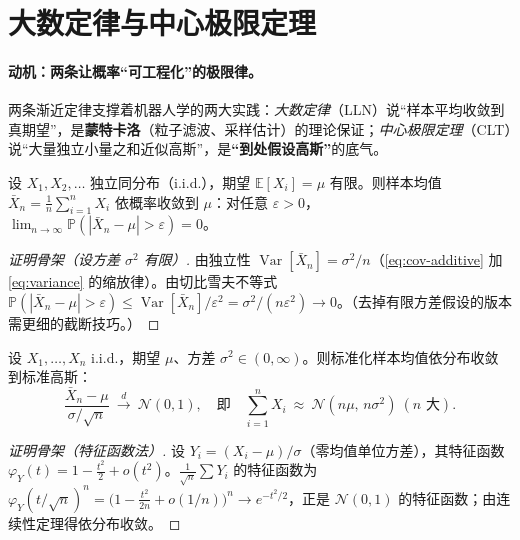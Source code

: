 \section{大数定律与中心极限定理}
\label{sec:prob-limit}

\paragraph{动机：两条让概率“可工程化”的极限律。}
两条渐近定律支撑着机器人学的两大实践：\emph{大数定律}（LLN）说“样本平均收敛到真期望”，是\textbf{蒙特卡洛}（粒子滤波、采样估计）的理论保证；\emph{中心极限定理}（CLT）说“大量独立小量之和近似高斯”，是\textbf{“到处假设高斯”}的底气。

\begin{theorem}[（弱）大数定律]\label{thm:lln}
设 $X_1,X_2,\dots$ 独立同分布（i.i.d.），期望 $\mathbb{E}[X_i]=\mu$ 有限。则样本均值 $\bar X_n=\frac1n\sum_{i=1}^n X_i$ 依概率收敛到 $\mu$：对任意 $\varepsilon>0$，$\lim_{n\to\infty}\mathbb{P}(|\bar X_n-\mu|>\varepsilon)=0$。
\end{theorem}
\begin{proof}[证明骨架（设方差 $\sigma^2$ 有限）]
由独立性 $\operatorname{Var}[\bar X_n]=\sigma^2/n$（\cref{eq:cov-additive} 加 \cref{eq:variance} 的缩放律）。由切比雪夫不等式 $\mathbb{P}(|\bar X_n-\mu|>\varepsilon)\le\operatorname{Var}[\bar X_n]/\varepsilon^2=\sigma^2/(n\varepsilon^2)\to0$。（去掉有限方差假设的版本需更细的截断技巧。）
\end{proof}

\begin{theorem}[中心极限定理]\label{thm:clt}
设 $X_1,\dots,X_n$ i.i.d.，期望 $\mu$、方差 $\sigma^2\in(0,\infty)$。则标准化样本均值依分布收敛到标准高斯：
\begin{equation}
  \frac{\bar X_n-\mu}{\sigma/\sqrt{n}}\ \xrightarrow{\ d\ }\ \mathcal{N}(0,1),
  \quad\text{即}\quad
  \sum_{i=1}^n X_i\ \approx\ \mathcal{N}(n\mu,\,n\sigma^2)\ (n\text{ 大}).
  \label{eq:clt}
\end{equation}
\end{theorem}
\begin{proof}[证明骨架（特征函数法）]
设 $Y_i=(X_i-\mu)/\sigma$（零均值单位方差），其特征函数 $\varphi_Y(t)=1-\tfrac{t^2}{2}+o(t^2)$。$\frac1{\sqrt n}\sum Y_i$ 的特征函数为 $\varphi_Y(t/\sqrt n)^n=\big(1-\tfrac{t^2}{2n}+o(1/n)\big)^n\to e^{-t^2/2}$，正是 $\mathcal{N}(0,1)$ 的特征函数；由连续性定理得依分布收敛。
\end{proof}

